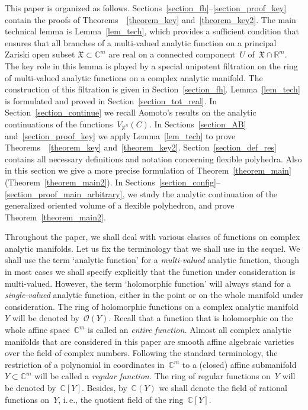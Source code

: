 \documentclass[reqno,tbtags,12pt]{amsart}
\numberwithin{equation}{section}
\newcommand{\R}{\mathbb{R}}
\newcommand{\C}{\mathbb{C}}
\newcommand{\X}{\mathbb{X}}
\newcommand{\FX}{\mathfrak{X}}
\newcommand{\CO}{\mathcal{O}}
\theoremstyle{definition}
\begin{document}
This paper is organized as follows. Sections~\ref{section_fh}--\ref{section_proof_key} contain the proofs of Theorems~~\ref{theorem_key} and~\ref{theorem_key2}. The main technical lemma is Lemma~\ref{lem_tech}, which provides a sufficient condition that ensures that all branches of a multi-valued analytic function on a principal  Zariski open subset $\FX\subset\C^m$ are real on a connected component~$U$ of~$\FX\cap\R^m$. The key role in this  lemma is played by a special unipotent filtration on the ring of multi-valued analytic functions on a complex analytic manifold. The construction of this filtration is given in Section~\ref{section_fh}. Lemma~\ref{lem_tech} is formulated and proved in Section~\ref{section_tot_real}. In Section~\ref{section_continue} we  recall Aomoto's results on the analytic continuations of the functions~$V_{\X^n}(C)$.   In Sections~\ref{section_AB} and~\ref{section_proof_key} we apply Lemma~\ref{lem_tech} to prove  Theorems~~\ref{theorem_key} and~\ref{theorem_key2}. Section~\ref{section_def_res} contains all necessary definitions and notation concerning flexible polyhedra. Also in this section we give a more precise formulation of Theorem~\ref{theorem_main} (Theorem~\ref{theorem_main2}). In Sections~\ref{section_config}--\ref{section_proof_main_arbitrary}, we study the analytic continuation of the generalized oriented volume of a flexible polyhedron, and  prove Theorem~\ref{theorem_main2}. 

Throughout the paper, we shall deal with various classes of functions on complex analytic manifolds. Let us fix the terminology that we shall use in the sequel. We shall use the term `analytic function' for a \textit{multi-valued\/} analytic function, though in most cases we shall specify explicitly that the function under consideration is multi-valued. However, the term `holomorphic function' will always stand for a \textit{single-valued\/} analytic function, either in the point or on the whole manifold under consideration. The ring of holomorphic functions on a complex analytic manifold~$Y$ will be denoted by~$\CO(Y)$. Recall that a function that is holomorphic on the whole affine space~$\C^m$ is called an \textit{entire function.} Almost all complex analytic manifolds that are considered in this paper are smooth affine algebraic varieties over the field of complex numbers.  Following the standard terminology, the restriction of a polynomial in coordinates in~$\C^m$ to a (closed) affine submanifold $Y\subset \C^m$ will be called a \textit{regular function.} The ring of regular functions on~$Y$ will be denoted by~$\C[Y]$. Besides, by~$\C(Y)$ we shall denote the field of rational functions on~$Y$, i.\,e., the quotient field of the ring~$\C[Y]$.
\end{document}
